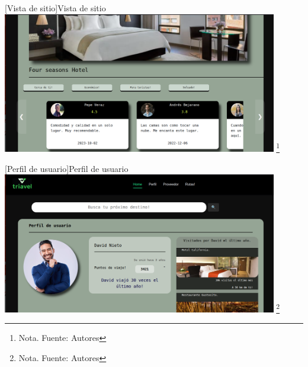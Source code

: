        \vspace{2mm}
    \begin{minipage}{0.9\textwidth}
    \centering
    [{Vista de sitio}]{Vista de sitio}
    \label{prot11}
    \includegraphics[width=0.9\textwidth]{Content/Images/VistaDeSitio.png}
    \footnote{Nota. \textup{Fuente: Autores}}
    \end{minipage}

      \vspace{2mm}
    \begin{minipage}{0.9\textwidth}
    \centering
    [{Perfil de usuario}]{Perfil de usuario}
    \label{prot12}
    \includegraphics[width=0.9\textwidth]{Content/Images/UserProfile.png}
    \footnote{Nota. \textup{Fuente: Autores}}
    \end{minipage}
